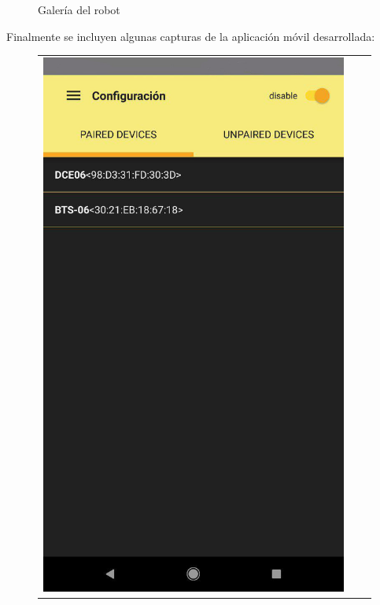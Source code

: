 \begin{figure}[h!]
\begin{tabular}{ccc}
\end{tabular}
\caption{Galería del robot}
\end{figure}

\newpage
Finalmente se incluyen algunas capturas de la aplicación móvil desarrollada:

\begin{figure}[h!]
\centering
\begin{tabular}{ccc}
  \includegraphics[scale=0.20]{img/App1.jpg}
&

\end{tabular}
\end{figure}
